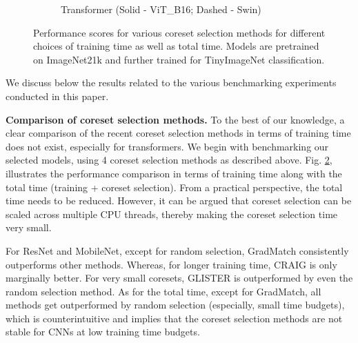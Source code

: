 \begin{figure}
\begin{subfigure}{1\linewidth}
\vspace{-0.2em}
\caption{Transformer (Solid - ViT\_B16; Dashed - Swin)}
\label{fig:sub-comp-coretran}
\end{subfigure}
\vspace{-2em}
\caption{Performance scores for various coreset selection methods for different choices of training time as well as total time. Models are pretrained on ImageNet21k and further trained for TinyImageNet classification.}
\label{fig:sub-comp-core}
\end{figure}






%
 We discuss below the results related to the various benchmarking experiments conducted in this paper. 


\textbf{Comparison of coreset selection methods. }To the best of our knowledge, a clear comparison of the recent coreset selection methods in terms of training time does not exist, especially for transformers. We begin with benchmarking our selected models, using 4 coreset selection methods as described above. Fig. \ref{fig:sub-comp-core}, illustrates the performance comparison in terms of training time along with the total time (training + coreset selection). From a practical perspective, the total time needs to be reduced. However, it can be argued that coreset selection can be scaled across multiple CPU threads, thereby making the coreset selection time very small. 


 


For ResNet and MobileNet, except for random selection, GradMatch consistently outperforms other methods. Whereas, for longer training time, CRAIG is only marginally better. For very small coresets, GLISTER is outperformed by even the random selection method. As for the total time, except for GradMatch, all methods get outperformed by random selection (especially, small time budgets), which is counterintuitive and implies that the coreset selection methods are not stable for CNNs at low training time budgets. 


